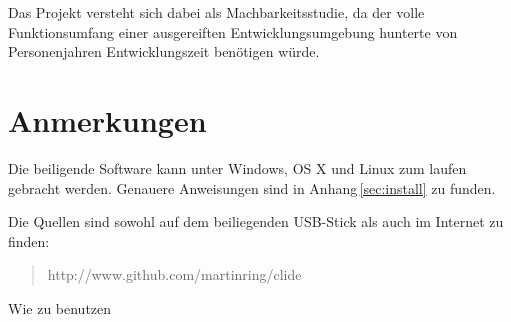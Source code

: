 Das Projekt versteht sich dabei als Machbarkeitsstudie, da der volle Funktionsumfang einer
ausgereiften Entwicklungsumgebung hunterte von Personenjahren Entwicklungszeit benötigen würde.

\section{Anmerkungen}

Die beiligende Software kann unter Windows, OS X und Linux zum laufen gebracht werden. Genauere
Anweisungen sind in Anhang\,\ref{sec:install} zu funden.

Die Quellen sind sowohl auf dem beiliegenden USB-Stick als auch im Internet zu finden:

\begin{quote}
http://www.github.com/martinring/clide
\end{quote}

Wie zu benutzen